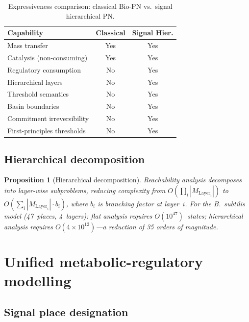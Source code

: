 \documentclass[11pt,a4paper]{article}
\theoremstyle{plain}
\newtheorem{proposition}[theorem]{Proposition}
\theoremstyle{definition}
\begin{document}
\begin{table}[htbp]
\centering
\small
\caption{Expressiveness comparison: classical Bio-PN vs.\ signal hierarchical PN.}
\label{tab:expressiveness}
\begin{tabular}{lcc}
\toprule
\textbf{Capability} & \textbf{Classical} & \textbf{Signal Hier.} \\
\midrule
Mass transfer & Yes & Yes \\
Catalysis (non-consuming) & Yes & Yes \\
Regulatory consumption & No & Yes \\
Hierarchical layers & No & Yes \\
Threshold semantics & No & Yes \\
Basin boundaries & No & Yes \\
Commitment irreversibility & No & Yes \\
First-principles thresholds & No & Yes \\
\bottomrule
\end{tabular}
\end{table}

\subsection{Hierarchical decomposition}

\begin{proposition}[Hierarchical decomposition]\label{prop:decomp}
Reachability analysis decomposes into layer-wise subproblems, reducing complexity from $O(\prod_{i} |M_{\mathrm{Layer}_i}|)$ to $O(\sum_{i} |M_{\mathrm{Layer}_i}| \cdot b_i)$, where $b_i$ is branching factor at layer~$i$. For the B.~subtilis model (47~places, 4~layers): flat analysis requires $O(10^{47})$~states; hierarchical analysis requires $O(4 \times 10^{12})$---a reduction of 35 orders of magnitude.
\end{proposition}


\section{Unified metabolic-regulatory modelling}

\subsection{Signal place designation}
\end{document}
